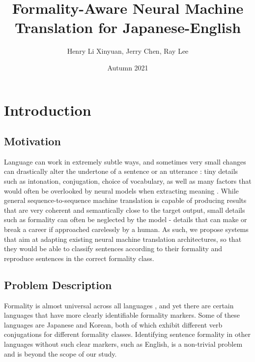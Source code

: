 \documentclass[11pt]{article}
\begin{document}
\title{Formality-Aware Neural Machine Translation for Japanese-English}

\author{Henry Li Xinyuan, Jerry Chen, Ray Lee}

\date{Autumn 2021}

\maketitle

\newpage

\tableofcontents

\newpage

\section{Introduction}

\subsection{Motivation}

Language can work in extremely subtle ways, and sometimes very small changes can drastically alter the undertone of a sentence or an utterance \cite{Feely:19} \cite{niu-etal-2018-multi}: tiny details such as intonation, conjugation, choice of vocabulary, as well as many factors that would often be overlooked by neural models when extracting meaning \cite{pavlick-tetreault-2016-empirical}. While general sequence-to-sequence machine translation is capable of producing results that are very coherent and semantically close to the target output, small details such as formality can often be neglected by the model \cite{rao2018dear} - details that can make or break a career if approached carelessly by a human. As such, we propose systems that aim at adapting existing neural machine translation architectures, so that they would be able to classify sentences according to their formality and reproduce sentences in the correct formality class. 

\subsection{Problem Description}

Formality is almost universal across all languages \cite{article}, and yet there are certain languages that have more clearly identifiable formality markers. Some of these languages are Japanese and Korean, both of which exhibit different verb conjugations for different formality classes. Identifying sentence formality in other languages without such clear markers, such as English, is a non-trivial problem \cite{pavlick-tetreault-2016-empirical} and is beyond the scope of our study. 
\end{document}
